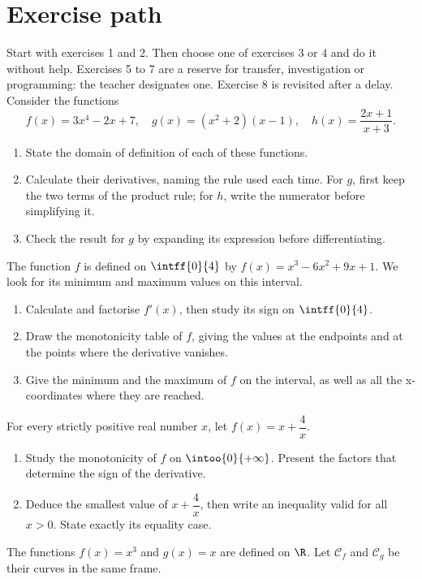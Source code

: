 \section*{Exercise path}\label{C06-PARC}
Start with exercises 1 and 2. Then choose one of exercises 3 or 4 and do it without help. Exercises 5 to 7 are a reserve for transfer, investigation or programming: the teacher designates one. Exercise 8 is revisited after a delay.
\begingroup
{}
Consider the functions\[f(x)=3x^4-2x+7,\quad g(x)=(x^2+2)(x-1),\quad h(x)=\dfrac{2x+1}{x+3}.\]
\begin{enumerate}[label=\arabic*.]
\item State the domain of definition of each of these functions.
\item Calculate their derivatives, naming the rule used each time. For $g$, first keep the two terms of the product rule; for $h$, write the numerator before simplifying it.
\item Check the result for $g$ by expanding its expression before differentiating.
\end{enumerate}
The function $f$ is defined on $\intff{0}{4}$ by $f(x)=x^3-6x^2+9x+1$. We look for its minimum and maximum values on this interval.
\begin{enumerate}[label=\arabic*.]
\item Calculate and factorise $f\prime(x)$, then study its sign on $\intff{0}{4}$.
\item Draw the monotonicity table of $f$, giving the values at the endpoints and at the points where the derivative vanishes.
\item Give the minimum and the maximum of $f$ on the interval, as well as all the x-coordinates where they are reached.
\end{enumerate}
For every strictly positive real number $x$, let $f(x)=x+\dfrac4x$.
\begin{enumerate}[label=\arabic*.]
\item Study the monotonicity of $f$ on $\intoo{0}{+\infty}$. Present the factors that determine the sign of the derivative.
\item Deduce the smallest value of $x+\dfrac4x$, then write an inequality valid for all $x>0$. State exactly its equality case.
\end{enumerate}
The functions $f(x)=x^3$ and $g(x)=x$ are defined on $\R$. Let $\mathcal C_f$ and $\mathcal C_g$ be their curves in the same frame.
